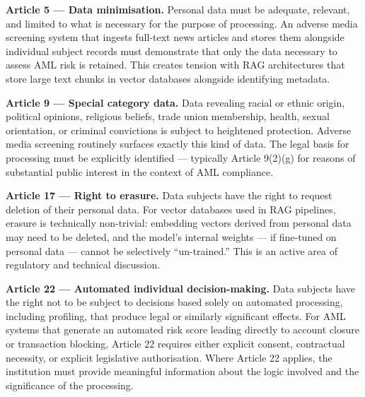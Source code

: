 \textbf{Article 5 --- Data minimisation.} Personal data must be adequate, relevant, and limited to what is necessary for the purpose of processing. An adverse media screening system that ingests full-text news articles and stores them alongside individual subject records must demonstrate that only the data necessary to assess AML risk is retained. This creates tension with RAG architectures that store large text chunks in vector databases alongside identifying metadata.

\textbf{Article 9 --- Special category data.} Data revealing racial or ethnic origin, political opinions, religious beliefs, trade union membership, health, sexual orientation, or criminal convictions is subject to heightened protection. Adverse media screening routinely surfaces exactly this kind of data. The legal basis for processing must be explicitly identified --- typically Article 9(2)(g) for reasons of substantial public interest in the context of AML compliance.

\textbf{Article 17 --- Right to erasure.} Data subjects have the right to request deletion of their personal data. For vector databases used in RAG pipelines, erasure is technically non-trivial: embedding vectors derived from personal data may need to be deleted, and the model's internal weights --- if fine-tuned on personal data --- cannot be selectively ``un-trained.'' This is an active area of regulatory and technical discussion.

\textbf{Article 22 --- Automated individual decision-making.} Data subjects have the right not to be subject to decisions based solely on automated processing, including profiling, that produce legal or similarly significant effects. For AML systems that generate an automated risk score leading directly to account closure or transaction blocking, Article 22 requires either explicit consent, contractual necessity, or explicit legislative authorisation. Where Article 22 applies, the institution must provide meaningful information about the logic involved and the significance of the processing.

